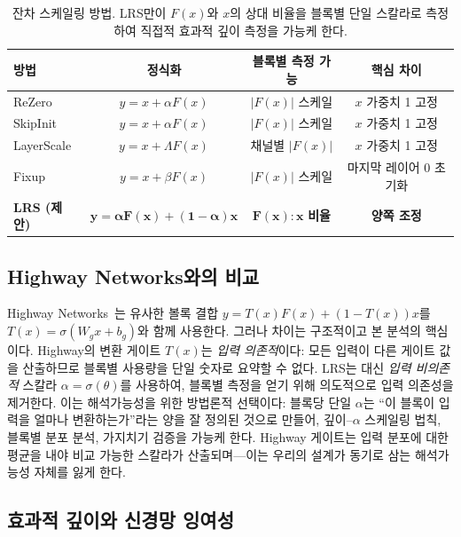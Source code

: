 \documentclass{bmvc2k}
\begin{document}
\begin{table}[!ht]
\centering
\small
\caption{잔차 스케일링 방법. LRS만이 $F(x)$와 $x$의 상대 비율을 블록별 단일 스칼라로 측정하여 직접적 효과적 깊이 측정을 가능케 한다.}
\label{tab:comparison}
\begin{tabular}{lccc}
\toprule
\textbf{방법} & \textbf{정식화} & \textbf{블록별 측정 가능} & \textbf{핵심 차이} \\
\midrule
ReZero & $y = x + \alpha F(x)$ & $|F(x)|$ 스케일 & $x$ 가중치 1 고정 \\
SkipInit & $y = x + \alpha F(x)$ & $|F(x)|$ 스케일 & $x$ 가중치 1 고정 \\
LayerScale & $y = x + \Lambda F(x)$ & 채널별 $|F(x)|$ & $x$ 가중치 1 고정 \\
Fixup & $y = x + \beta F(x)$ & $|F(x)|$ 스케일 & 마지막 레이어 0 초기화 \\
\textbf{LRS (제안)} & $\mathbf{y = \alpha F(x) + (1{-}\alpha)x}$ & $\mathbf{F(x){:}x}$ \textbf{비율} & \textbf{양쪽 조정} \\
\bottomrule
\end{tabular}
\end{table}

\subsection{Highway Networks와의 비교}

Highway Networks~\cite{srivastava2015highway}는 유사한 볼록 결합 $y = T(x) F(x) + (1{-}T(x)) x$를 $T(x) = \sigma(W_g x + b_g)$와 함께 사용한다. 그러나 차이는 구조적이고 본 분석의 핵심이다. Highway의 변환 게이트 $T(x)$는 \emph{입력 의존적}이다: 모든 입력이 다른 게이트 값을 산출하므로 블록별 사용량을 단일 숫자로 요약할 수 없다. LRS는 대신 \emph{입력 비의존적} 스칼라 $\alpha = \sigma(\theta)$를 사용하여, 블록별 측정을 얻기 위해 의도적으로 입력 의존성을 제거한다. 이는 해석가능성을 위한 방법론적 선택이다: 블록당 단일 $\alpha$는 ``이 블록이 입력을 얼마나 변환하는가''라는 양을 잘 정의된 것으로 만들어, 깊이--$\alpha$ 스케일링 법칙, 블록별 분포 분석, 가지치기 검증을 가능케 한다. Highway 게이트는 입력 분포에 대한 평균을 내야 비교 가능한 스칼라가 산출되며---이는 우리의 설계가 동기로 삼는 해석가능성 자체를 잃게 한다.

\subsection{효과적 깊이와 신경망 잉여성}
\end{document}
